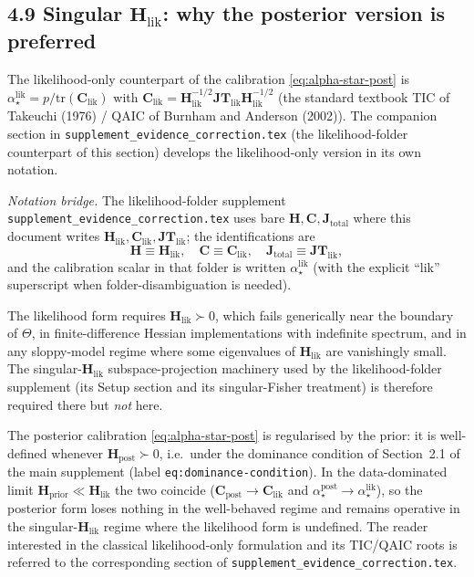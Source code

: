\documentclass[11pt]{article}
\begin{document}
\subsection*{4.9 Singular $\mathbf H_{\mathrm{lik}}$: why the posterior version is preferred}

The likelihood-only counterpart of the calibration \eqref{eq:alpha-star-post} is
$\alpha_\star^{\mathrm{lik}} = p / \mathrm{tr}(\mathbf C_{\mathrm{lik}})$ with
$\mathbf C_{\mathrm{lik}} = \mathbf H_{\mathrm{lik}}^{-1/2}
\mathbf{JT}_{\mathrm{lik}} \mathbf H_{\mathrm{lik}}^{-1/2}$ (the standard
textbook TIC of Takeuchi (1976) / QAIC of Burnham and Anderson (2002)). The
companion section in \texttt{supplement\_evidence\_correction.tex}
(the likelihood-folder counterpart of this section) develops the
likelihood-only version in its own notation.

\emph{Notation bridge.} The likelihood-folder supplement
\texttt{supplement\_evidence\_correction.tex} uses bare
$\mathbf H, \mathbf C, \mathbf J_{\mathrm{total}}$ where this document writes
$\mathbf H_{\mathrm{lik}}, \mathbf C_{\mathrm{lik}}, \mathbf{JT}_{\mathrm{lik}}$;
the identifications are
\[
\mathbf H \equiv \mathbf H_{\mathrm{lik}},
\quad
\mathbf C \equiv \mathbf C_{\mathrm{lik}},
\quad
\mathbf J_{\mathrm{total}} \equiv \mathbf{JT}_{\mathrm{lik}},
\]
and the calibration scalar in that folder is written
$\alpha_\star^{\mathrm{lik}}$ (with the explicit ``lik'' superscript when
folder-disambiguation is needed).

The likelihood form requires $\mathbf H_{\mathrm{lik}} \succ 0$, which fails
generically near the boundary of $\Theta$, in finite-difference Hessian
implementations with indefinite spectrum, and in any sloppy-model regime where
some eigenvalues of $\mathbf H_{\mathrm{lik}}$ are vanishingly small. The
singular-$\mathbf H_{\mathrm{lik}}$ subspace-projection machinery used by the
likelihood-folder supplement (its Setup section and its singular-Fisher
treatment) is therefore required there but \emph{not} here.

The posterior calibration \eqref{eq:alpha-star-post} is regularised by the
prior: it is well-defined whenever $\mathbf H_{\mathrm{post}} \succ 0$, i.e.\
under the dominance condition of Section~2.1 of the main supplement
(label \texttt{eq:dominance-condition}). In the data-dominated limit
$\mathbf H_{\mathrm{prior}} \ll \mathbf H_{\mathrm{lik}}$ the two coincide
($\mathbf C_{\mathrm{post}} \to \mathbf C_{\mathrm{lik}}$ and
$\alpha_\star^{\mathrm{post}} \to \alpha_\star^{\mathrm{lik}}$), so the
posterior form loses nothing in the well-behaved regime and remains operative
in the singular-$\mathbf H_{\mathrm{lik}}$ regime where the likelihood form is
undefined. The reader interested in the classical likelihood-only formulation
and its TIC/QAIC roots is referred to the corresponding section of
\texttt{supplement\_evidence\_correction.tex}.
\end{document}
